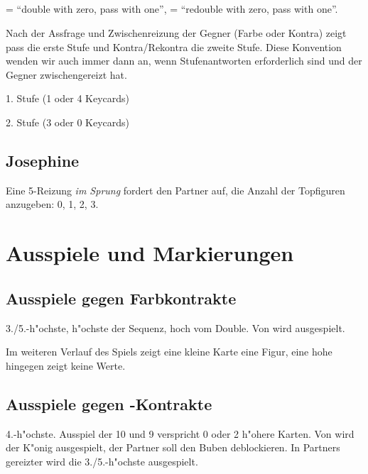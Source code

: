 \subsection{}

 = ``double with zero, pass with one'',  =
``redouble with zero, pass with one''.

Nach der Assfrage und Zwischenreizung der Gegner (Farbe oder Kontra) zeigt pass
die erste Stufe und Kontra/Rekontra die zweite Stufe. Diese Konvention wenden
wir auch immer dann an, wenn Stufenantworten erforderlich sind und der Gegner
zwischengereizt hat.
%
\bdsc
  \item[pass] 1. Stufe (1 oder 4 Keycards)
  \item[\kontra/\rekontra] 2. Stufe (3 oder 0 Keycards)
\edsc

\subsection{Josephine}

Eine 5\SA-Reizung \emph{im Sprung} fordert den Partner auf, die Anzahl der
Topfiguren anzugeben: 0, 1, 2, 3.

\newpage
\section{Ausspiele und Markierungen}

\subsection{Ausspiele gegen Farbkontrakte}

3./5.-h"ochste, h"ochste der Sequenz, hoch vom Double.
Von  wird  ausgespielt.

Im weiteren Verlauf des Spiels zeigt eine kleine Karte eine
Figur, eine hohe hingegen zeigt keine Werte.

\subsection{Ausspiele gegen \sa-Kontrakte}

4.-h"ochste. Ausspiel der 10 und 9 verspricht 0 oder 2 h"ohere Karten. Von
 wird der K"onig ausgespielt, der Partner soll den Buben
deblockieren. In
Partners gereizter wird die 3./5.-h"ochste ausgespielt.

